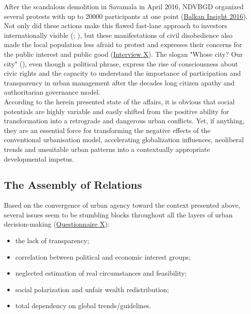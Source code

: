 \documentclass[11pt]{report}
\begin{document}
{{{{After the scandalous demolition in Savamala in April 2016, NDVBGD organized several protests with up to 20000 participants at one point (\href{Balkan Insight}{Balkan Insight 2016}).
Not only did these actions make this flawed fast-lane approach to investors internationally visible (\href{ref}{\citealt{eror_belgrades_2015}}; \href{ref}{\citealt{wright_belgrade_2015}}), but these manifestations of civil disobedience also made the local population less afraid to protest and expresses their concerns for the public interest and public good
(\href{InterviewX}{Interview X}).
The slogan "Whose city? Our city" (\href{ref}{\citealt{tulimirovic_protest_2016}}), even though a political phrase, express the rise of consciousness about civic rights and the capacity to understand the importance of participation and transparency in urban management after the decades long citizen apathy and authoritarian governance model.
\\

According to the herein presented state of the affairs, it is obvious that social potentials are highly variable and easily shifted from the positive ability for transformation into a retrograde and dangerous urban conflicts. Yet, if anything, they are an essential force for transforming the negative effects of the conventional urbanisation model, accelerating globalization influences, neoliberal trends and unsuitable urban patterns into a contextually appropriate developmental  impetus. 

\subsection{The Assembly of Relations}

Based on the convergence of urban agency toward  the context presented above, several issues seem to be stumbling blocks throughout all the layers of urban decision-making
(\href{Questionnaire Experts Post-socialist}{Questionnaire X}):

\begin{itemize}
\item the lack of transparency;
\item correlation between political and economic interest groups;
\item neglected estimation of real circumstances and feasibility;
\item social polarization and unfair wealth redistribution;
\item total dependency on global trends/guidelines.
\end{itemize}

}}}}
\end{document}
